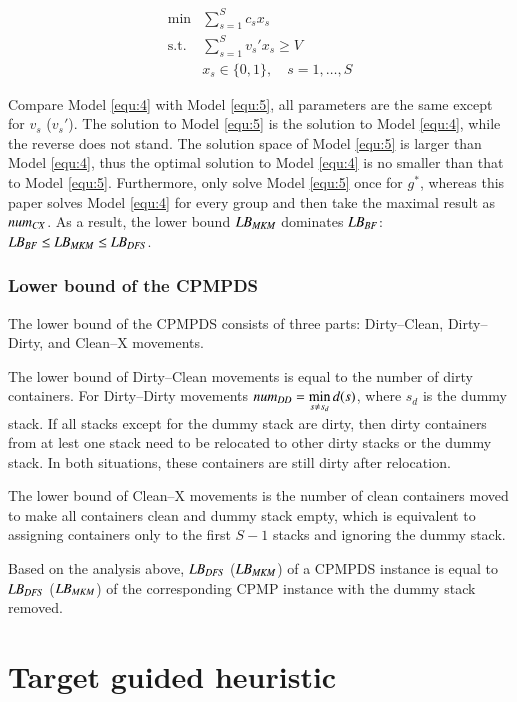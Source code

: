 \documentclass[review,3p,times,authoryear,12pt]{elsarticle}
\begin{document}
\begin{equation}
\label{equ:5}
\begin{array}{rl}
\min & \sum\limits_{s=1}^S c_s x_s\\
\mathrm{s.t.} &\sum\limits_{s=1}^S v_s' x_s\ge V\\
&x_s\in\{0,1\}, \quad s=1,\dots,S
\end{array}
\end{equation}

Compare Model \ref{equ:4} with Model \ref{equ:5}, all parameters are the same except for $v_s$ ($v_s'$). The solution to Model \ref{equ:5} is the solution to Model \ref{equ:4}, while the reverse does not stand. The solution space of Model \ref{equ:5} is larger than Model \ref{equ:4}, thus the optimal solution to Model \ref{equ:4} is no smaller than that to Model \ref{equ:5}. Furthermore, \cite{BF2012} only solve Model \ref{equ:5} once for $g^*$, whereas this paper solves Model \ref{equ:4} for every group and then take the maximal result as $\id{num}_\id{CX}$. As a result, the lower bound $\id{LB}_\id{MKM}$ dominates $\id{LB}_\id{BF}$: $\id{LB}_\id{BF}\le \id{LB}_\id{MKM}\le \id{LB}_\id{DFS}$.
\subsubsection{Lower bound of the CPMPDS}

The lower bound of the CPMPDS consists of three parts: Dirty--Clean, Dirty--Dirty, and Clean--X movements.

The lower bound of Dirty--Clean movements is equal to the number of dirty containers. For Dirty--Dirty movements $\id{num}_\id{DD}=\min\limits_{s\neq s_d} d(s)$, where $s_d$ is the dummy stack. If all stacks except for the dummy stack are dirty, then dirty containers from at lest one stack need to be relocated to other dirty stacks or the dummy stack. In both situations, these containers are still dirty after relocation.

The lower bound of Clean--X movements is the number of clean containers moved to make all containers clean and dummy stack empty, which is equivalent to assigning containers only to the first $S-1$ stacks and ignoring the dummy stack.

Based on the analysis above, $\id{LB}_\id{DFS}$ ($\id{LB}_\id{MKM}$) of a CPMPDS instance is equal to $\id{LB}_\id{DFS}$ ($\id{LB}_\id{MKM}$) of the corresponding CPMP instance with the dummy stack removed.

\section{Target guided heuristic}
\label{sec:heu}
\end{document}
